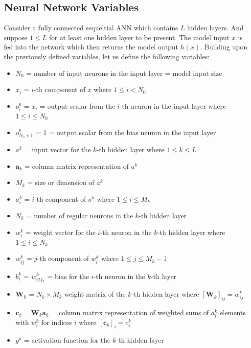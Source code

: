 \documentclass[letterpaper, 11pt]{article}
\numberwithin{equation}{section}
\numberwithin{figure}{section}
\numberwithin{table}{section}
\begin{document}
\subsection{Neural Network Variables}
Consider a fully connected sequeltial ANN which contains \(L\) hidden layers. And suppose \(1 \le L\) for at least one hidden layer to be present. The model input \(x\) is fed into the network which then returns the model output \(h(x)\). Building upon the previously defined variables, let us define the following variables:

\begin{itemize}
	\item \(N_{0}\) = number of input neurons in the input layer = model input size
	\item \(x_{i}\) = \(i\)-th component of \(x\) where \(1 \le i < N_{0}\)
	\item \(o^{0}_{i}\) = \(x_{i}\) = output scalar from the \(i\)-th neuron in the input layer where \(1 \le i \le N_{0}\) 
	\item \(o^{0}_{N_{0}+1}\) = 1 = output scalar from the bias neuron in the input layer
	\item \(a^{k}\) = input vector for the \(k\)-th hidden layer where \(1 \le k \le L\)
	\item \(\textbf{a}_{k}\) = column matrix representation of \(a^{k}\)
	\item \(M_{k}\) = size or dimension of \(a^{k}\) 
	\item \(a^{k}_{i}\) = \(i\)-th component of \(a^{k}\) where \(1 \le i \le M_{k}\)
	\item \(N_{k}\) = number of regular neurons in the \(k\)-th hidden layer
	\item \(w^{k}_{i}\) = weight vector for the \(i\)-th neuron in the \(k\)-th hidden layer where \(1 \le i \le N_{k}\)
	\item \(w^{k}_{ij}\) = \(j\)-th component of \(w^{k}_{i}\) where \(1 \le j \le M_{k} - 1\)
	\item \(b^{k}_{i}\) = \(w^{k}_{iM_{k}}\) = bias for the \(i\)-th neuron in the \(k\)-th layer
	\item \(\textbf{W}_{k}\) = \(N_{k} \times M_{k}\) weight matrix of the \(k\)-th hidden layer where \([\textbf{W}_{k}]_{ij} = w^{k}_{ij}\)  
	\item \(\textbf{c}_{k} = \textbf{W}_{k}\textbf{a}_{k}\) = column matrix representation of weighted sums of \(a^{k}_{i}\) elements with \(w^{k}_{i}\) for indices \(i\) where \([\textbf{c}_{k}]_{i} = c^{k}_{i}\)
	\item \(g^{k}\) = activation function for the \(k\)-th hidden layer

\end{itemize}
\end{document}
